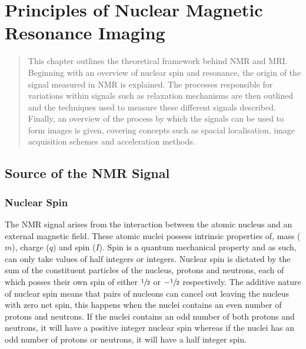 \chapter{Principles of Nuclear Magnetic Resonance Imaging}
\label{chap:Theory}
\newpage
\begin{abstract}
	This chapter outlines the theoretical framework behind \ac*{NMR} and \ac*{MRI}. Beginning with an overview of nuclear spin and resonance, the origin of the signal measured in \ac{NMR} is explained. The processes responsible for variations within signals such as relaxation mechanisms are then outlined and the techniques used to measure these different signals described. Finally, an overview of the process by which the signals can be used to form images is given, covering concepts such as spacial localisation, image acquisition schemes and acceleration methods.
\end{abstract}
\newpage

\section{Source of the NMR Signal}
\label{sec:theory_source_of_nmr}

\subsection{Nuclear Spin}
\label{subsec:theory_nuclear_spin}
The \ac{NMR} signal arises from the interaction between the atomic nucleus and an external magnetic field. These atomic nuclei possess intrinsic properties of, mass ($m$), charge ($q$) and spin ($I$). Spin is a quantum mechanical property and as such, can only take values of half integers or integers. Nuclear spin is dictated by the sum of the constituent particles of the nucleus, protons and neutrons, each of which posses their own spin of either $\sfrac{1}{2}$ or $-\sfrac{1}{2}$ respectively. The additive nature of nuclear spin means that pairs of nucleons can cancel out leaving the nucleus with zero net spin, this happens when the nuclei contains an even number of protons and neutrons. If the nuclei contains an odd number of both protons and neutrons, it will have a positive integer nuclear spin whereas if the nuclei has an odd number of protons or neutrons, it will have a half integer spin. 


